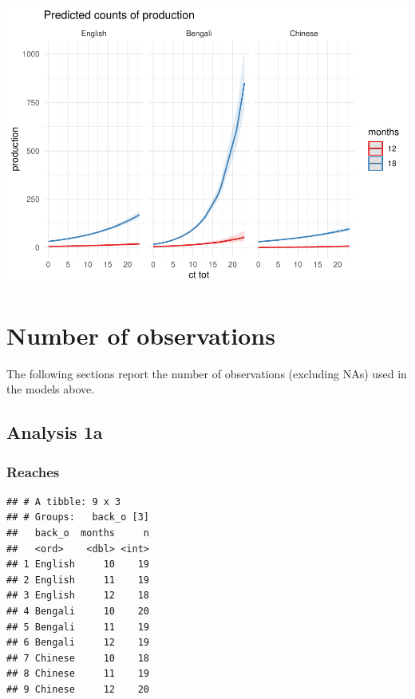 \documentclass[]{article}
\newenvironment{Shaded}{\begin{snugshade}}{\end{snugshade}}
\newcommand{\DataTypeTok}[1]{\textcolor[rgb]{0.13,0.29,0.53}{#1}}
\newcommand{\KeywordTok}[1]{\textcolor[rgb]{0.13,0.29,0.53}{\textbf{#1}}}
\newcommand{\NormalTok}[1]{#1}
\newcommand{\OperatorTok}[1]{\textcolor[rgb]{0.81,0.36,0.00}{\textbf{#1}}}
\newcommand{\StringTok}[1]{\textcolor[rgb]{0.31,0.60,0.02}{#1}}
\begin{document}
\includegraphics{supplement_files/figure-latex/ct-lm-2-undsay-plot-1.pdf}

\newpage

\hypertarget{number-of-observations}{%
\section{Number of observations}\label{number-of-observations}}

The following sections report the number of observations (excluding NAs)
used in the models above.

\hypertarget{analysis-1a}{%
\subsection{Analysis 1a}\label{analysis-1a}}

\hypertarget{reaches-3}{%
\subsubsection{Reaches}\label{reaches-3}}

\begin{Shaded}
\end{Shaded}

\begin{verbatim}
## # A tibble: 9 x 3
## # Groups:   back_o [3]
##   back_o  months     n
##   <ord>    <dbl> <int>
## 1 English     10    19
## 2 English     11    19
## 3 English     12    18
## 4 Bengali     10    20
## 5 Bengali     11    19
## 6 Bengali     12    19
## 7 Chinese     10    18
## 8 Chinese     11    19
## 9 Chinese     12    20
\end{verbatim}
\end{document}
